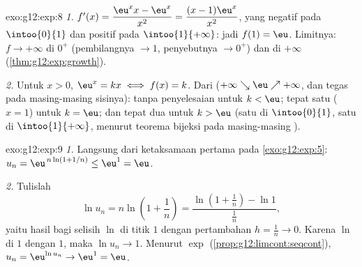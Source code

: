 \begin{solution}{exo:g12:exp:8}
\emph{1.} $f'(x) = \dfrac{\eu^x x - \eu^x}{x^2} = \dfrac{(x-1)\eu^x}{x^2}$,
yang negatif pada $\intoo{0}{1}$ dan positif pada $\intoo{1}{+\infty}$: jadi
 $f(1) = \eu$. Limitnya: $f \to +\infty$ di $0^+$ (pembilangnya
$\to 1$, penyebutnya $\to 0^+$) dan di $+\infty$ (\cref{thm:g12:exp:growth}).

\emph{2.} Untuk $x > 0$, $\eu^x = kx \iff f(x) = k$. Dari 
($+\infty \searrow \eu \nearrow +\infty$,  dan tegas 
pada masing-masing sisinya): tanpa penyelesaian untuk $k < \eu$; tepat satu
($x = 1$) untuk $k = \eu$; dan tepat dua untuk $k > \eu$ (satu di
$\intoo{0}{1}$, satu di $\intoo{1}{+\infty}$, menurut teorema bijeksi pada
masing-masing ).
\end{solution}

\begin{solution}{exo:g12:exp:9}
\emph{1.} Langsung dari ketaksamaan pertama pada \cref{exo:g12:exp:5}:
$u_n = \eu^{\,n\ln(1+1/n)} \leq \eu^1 = \eu$.

\emph{2.} Tulislah
\[
\ln u_n = n \ln\!\left(1 + \frac1n\right)
= \frac{\ln\!\left(1 + \frac1n\right) - \ln 1}{\frac1n},
\]
yaitu hasil bagi selisih $\ln$ di titik $1$ dengan pertambahan
$h = \frac1n \to 0$. Karena $\ln$  di $1$ dengan 
$1$, maka $\ln u_n \to 1$. Menurut  $\exp$
(\cref{prop:g12:limcont:seqcont}), $u_n = \eu^{\ln u_n} \to \eu^1 = \eu$.
\end{solution}

